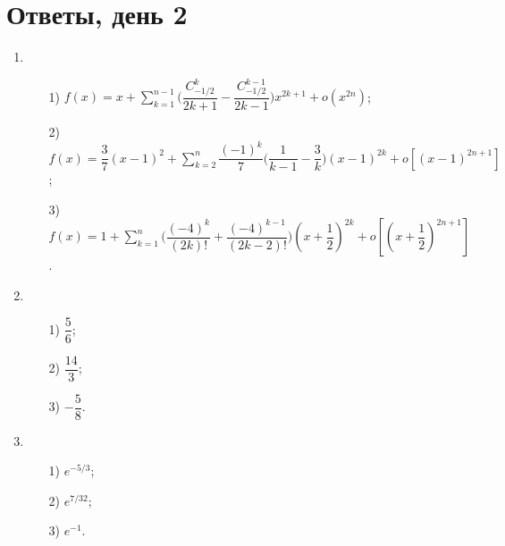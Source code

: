 \documentclass[a4paper,12pt]{article}
\begin{document}
\section*{Ответы, день 2}

\begin{enumerate}
     	\item 
     	\begin{enumerate}
     		\item[1)] $f(x) = x + \sum\limits_{k = 1}^{n - 1} \bigg( \dfrac{C_{-1/2}^k}{2k + 1} - \dfrac{C_{-1/2}^{k - 1}}{2k - 1} \bigg) x^{2k + 1} + o(x^{2n})$;
     		\item[2)] $f(x) = \dfrac{3}{7} (x - 1)^2 + \sum\limits_{k = 2}^n \dfrac{(-1)^k}{7} \bigg( \dfrac{1}{k - 1} - \dfrac{3}{k} \bigg) (x - 1)^{2k} + o[ (x - 1)^{2n+1} ]$;
     		\item[3)] $ f(x) = 1 + \sum\limits_{k = 1}^n \bigg( \dfrac{(-4)^k}{(2k)!} + \dfrac{(-4)^{k - 1}}{(2k - 2)!} \bigg) (x + \dfrac{1}{2})^{2k} + o[ (x + \dfrac{1}{2})^{2n + 1} ] $.
     	\end{enumerate}
     	
     	\item 
     	\begin{enumerate}
     		\item[1)] $\dfrac{5}{6}$;
     		\item[2)] $\dfrac{14}{3}$;
     		\item[3)] $-\dfrac{5}{8}$.
     	\end{enumerate}
     	
     	\item 
     	\begin{enumerate}
     		\item[1)] $e^{-5/3}$;
     		\item[2)] $e^{7/32}$;
     		\item[3)] $e^{-1}$.
     	\end{enumerate}
\end{enumerate}
\end{document}
